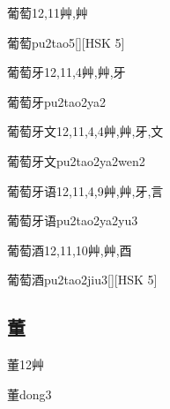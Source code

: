 \begin{Entry}{葡萄}{12,11}{⾋,⾋}
  \begin{Phonetics}{葡萄}{pu2tao5}[][HSK 5]
  \end{Phonetics}
\end{Entry}

\begin{Entry}{葡萄牙}{12,11,4}{⾋,⾋,⽛}
  \begin{Phonetics}{葡萄牙}{pu2tao2ya2}
  \end{Phonetics}
\end{Entry}

\begin{Entry}{葡萄牙文}{12,11,4,4}{⾋,⾋,⽛,⽂}
  \begin{Phonetics}{葡萄牙文}{pu2tao2ya2wen2}
  \end{Phonetics}
\end{Entry}

\begin{Entry}{葡萄牙语}{12,11,4,9}{⾋,⾋,⽛,⾔}
  \begin{Phonetics}{葡萄牙语}{pu2tao2ya2yu3}
  \end{Phonetics}
\end{Entry}

\begin{Entry}{葡萄酒}{12,11,10}{⾋,⾋,⾣}
  \begin{Phonetics}{葡萄酒}{pu2tao2jiu3}[][HSK 5]
  \end{Phonetics}
\end{Entry}

\subsection*{董}

\begin{Entry}{董}{12}{⾋}
  \begin{Phonetics}{董}{dong3}
  \end{Phonetics}
\end{Entry}

